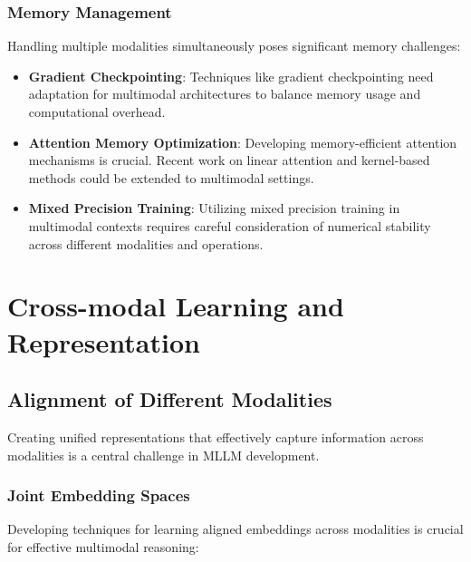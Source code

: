 \subsubsection{Memory Management}
Handling multiple modalities simultaneously poses significant memory challenges:

\begin{itemize}
    \item \textbf{Gradient Checkpointing}: Techniques like gradient checkpointing \citep{chen2016training} need adaptation for multimodal architectures to balance memory usage and computational overhead.
    
    \item \textbf{Attention Memory Optimization}: Developing memory-efficient attention mechanisms is crucial. Recent work on linear attention \citep{katharopoulos2020transformers} and kernel-based methods \citep{choromanski2021rethinking} could be extended to multimodal settings.
    
    \item \textbf{Mixed Precision Training}: Utilizing mixed precision training \citep{micikevicius2018mixed} in multimodal contexts requires careful consideration of numerical stability across different modalities and operations.
\end{itemize}

\section{Cross-modal Learning and Representation}

\subsection{Alignment of Different Modalities}
Creating unified representations that effectively capture information across modalities is a central challenge in MLLM development.

\subsubsection{Joint Embedding Spaces}
Developing techniques for learning aligned embeddings across modalities is crucial for effective multimodal reasoning:


